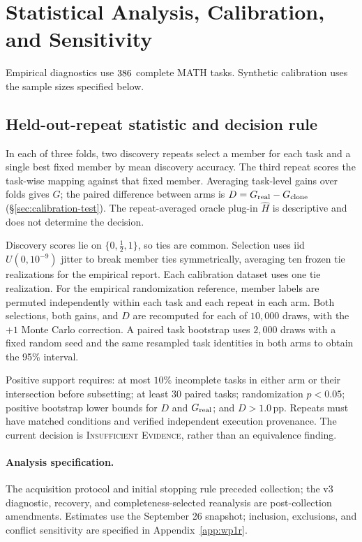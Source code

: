 \section{Statistical Analysis, Calibration, and Sensitivity}\label{app:statistics}\label{app:diagnostics}
Empirical diagnostics use $386$ complete MATH tasks.
Synthetic calibration uses the sample sizes specified below.

\subsection{Held-out-repeat statistic and decision rule}
In each of three folds, two discovery repeats select a member for each
task and a single best fixed member by mean discovery accuracy. The
third repeat scores the task-wise mapping against that fixed member.
Averaging task-level gains over folds gives $G$; the paired difference
between arms is $D=G_{\rm real}-G_{\rm clone}$
(\S\ref{sec:calibration-test}). The repeat-averaged oracle plug-in
$\widehat H$ is descriptive and does not determine the decision.

Discovery scores lie on $\{0,\tfrac12,1\}$, so ties are common.
Selection uses iid $U(0,10^{-9})$ jitter to break member ties
symmetrically, averaging ten frozen tie realizations for the empirical
report. Each calibration dataset uses one tie realization.
For the empirical randomization reference, member labels are permuted
independently within each task and each repeat in each arm. Both
selections, both gains, and $D$ are recomputed for each of $10{,}000$
draws, with the $+1$ Monte Carlo correction. A paired task bootstrap
uses $2{,}000$ draws with a fixed random seed and the same resampled
task identities in both arms to obtain the 95\% interval.

Positive support requires: at most $10\%$ incomplete tasks in either
arm or their intersection before subsetting; at least $30$ paired
tasks; randomization $p<0.05$; positive bootstrap lower bounds for
$D$ and $G_{\rm real}$; and $D>1.0$\,pp. Repeats must have matched
conditions and verified independent execution provenance.
The current decision is \textsc{Insufficient Evidence}, rather
than an equivalence finding.

\paragraph{Analysis specification.}
The acquisition protocol and initial stopping rule preceded collection;
the v3 diagnostic, recovery, and completeness-selected reanalysis are
post-collection amendments. Estimates use the September 26 snapshot;
inclusion, exclusions, and conflict sensitivity are specified in
Appendix~\ref{app:wp1r}.

